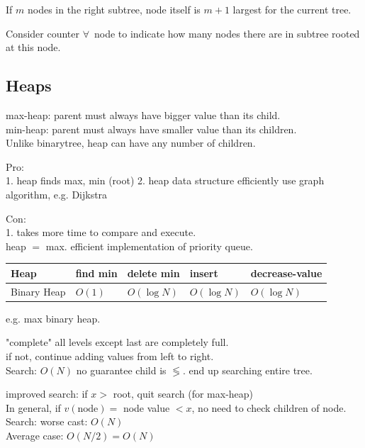 \documentclass[10pt]{amsart}
\begin{document}
If $m$ nodes in the right subtree, node itself is $m+1$ largest for the current tree.

Consider counter $\forall \,$ node to indicate how many nodes there are in subtree rooted at this node.

\subsection{Heaps}

max-heap: parent must always have bigger value than its child. \\
min-heap: parent must always have smaller value than its children. \\
Unlike binarytree, heap can have any number of children. 

Pro: \\ 
1. heap finds max, min (root)
2. heap data structure efficiently use graph algorithm, e.g. Dijkstra

Con: \\
1. takes more time to compare and execute. \\
heap $ = $ max. efficient implementation of priority queue. 

\begin{center}
	\begin{tabular}{ l | l | l | l | l  }
		\hline
		Heap & find min & delete min & insert & decrease-value \\ \hline
		Binary Heap & $O(1)$ & $O(\log{N})$ & $O(\log{N})$ & $O(\log{N})$ \\ \hline 
		\hline
	\end{tabular}
\end{center}

e.g. max binary heap.

"complete" all levels except last are completely full. \\
if not, continue adding values from left to right. \\

Search: $O(N)$ no guarantee child is $\lessgtr$. end up searching entire tree.

improved search: if $x >$ root, quit search (for max-heap) \\
In general, if $v(\text{node}) =$ node value $< x$, no need to check children of node. \\

Search: worse cast: $O(N)$ \\
\phantom{Search} Average case: $O(N/2) = O(N)$ \\
\end{document}
